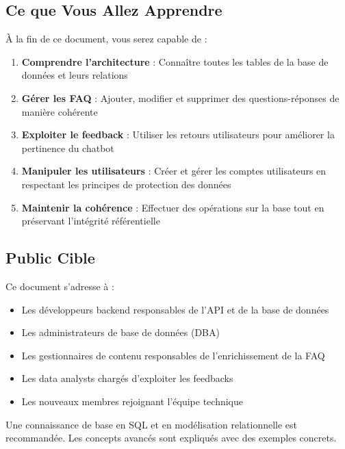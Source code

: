 \documentclass[11pt,a4paper]{article}
\begin{document}
\subsection{Ce que Vous Allez Apprendre}

À la fin de ce document, vous serez capable de :

\begin{enumerate}
    \item \textbf{Comprendre l'architecture} : Connaître toutes les tables de la base de données et leurs relations
    \item \textbf{Gérer les FAQ} : Ajouter, modifier et supprimer des questions-réponses de manière cohérente
    \item \textbf{Exploiter le feedback} : Utiliser les retours utilisateurs pour améliorer la pertinence du chatbot
    \item \textbf{Manipuler les utilisateurs} : Créer et gérer les comptes utilisateurs en respectant les principes de protection des données
    \item \textbf{Maintenir la cohérence} : Effectuer des opérations sur la base tout en préservant l'intégrité référentielle
\end{enumerate}

\subsection{Public Cible}

Ce document s'adresse à :
\begin{itemize}
    \item Les développeurs backend responsables de l'API et de la base de données
    \item Les administrateurs de base de données (DBA)
    \item Les gestionnaires de contenu responsables de l'enrichissement de la FAQ
    \item Les data analysts chargés d'exploiter les feedbacks
    \item Les nouveaux membres rejoignant l'équipe technique
\end{itemize}

\begin{astuce}[Prérequis]
Une connaissance de base en SQL et en modélisation relationnelle est recommandée. Les concepts avancés sont expliqués avec des exemples concrets.
\end{astuce}

\clearpage
\end{document}
